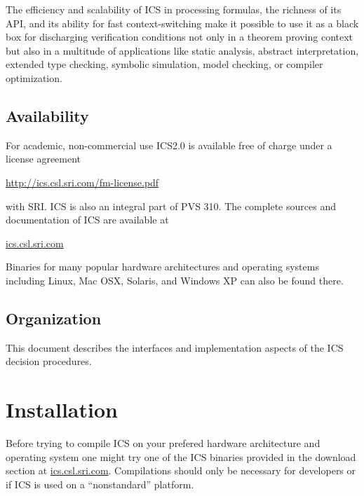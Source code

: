\documentclass[12pt]{article}
\begin{document}
The efficiency and scalability of ICS in processing formulas,
the richness of its API, and its ability for fast context-switching
make it possible to use it as a black box for discharging
verification conditions not only in a theorem proving context
but also in a multitude of applications like static analysis,
abstract interpretation, extended type checking,
symbolic simulation, model checking, or compiler
optimization.


\subsection{Availability}

For academic, non-commercial use ICS2.0 is available free of charge under a 
license agreement 
   \begin{center}
   \url{http://ics.csl.sri.com/fm-license.pdf}
   \end{center}
with SRI.  ICS is also an integral part of PVS 310\@.
The complete sources and documentation of ICS are available at
  \begin{center}
  \url{ics.csl.sri.com}
  \end{center}
Binaries for many popular hardware architectures and
operating systems including Linux, Mac OSX, Solaris, 
and Windows XP can also be found there.


\subsection{Organization}

This document describes the interfaces and implementation
aspects of the ICS decision procedures.  


%


\section{Installation}\label{sec:installation}

Before trying to compile ICS on your prefered hardware architecture and
operating system one might try one of the ICS binaries provided in the
download section at \url{ics.csl.sri.com}\@. Compilations should only
be necessary for developers or if ICS is used on a ``nonstandard'' platform.
\end{document}
